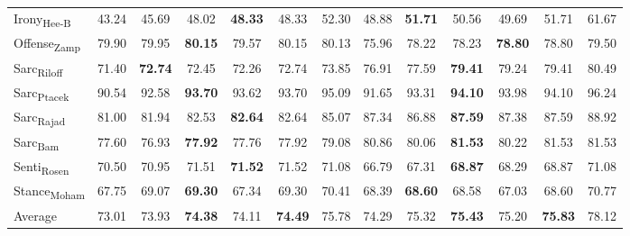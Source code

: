 \begin{table*}[]
\begin{tabular}{@{}lcccc:cc|cccc:cc@{}}
Irony\textsubscript{Hee-B}        & 43.24       & 45.69       & 48.02       & \textbf{48.33}       & 48.33         & 52.30         & 48.88       & \textbf{51.71}       & 50.56       & 49.69       & 51.71         & 61.67         \\
Offense\textsubscript{Zamp}       & 79.90       & 79.95       & \textbf{80.15}       & 79.57       & 80.15         & 80.13         & 75.96       & 78.22       & 78.23       & \textbf{78.80}       & 78.80         & 79.50         \\
Sarc\textsubscript{Riloff}        & 71.40       & \textbf{72.74}       & 72.45       & 72.26       & 72.74         & 73.85         & 76.91       & 77.59       & \textbf{79.41}       & 79.24       & 79.41         & 80.49         \\
Sarc\textsubscript{Ptacek}        & 90.54       & 92.58       & \textbf{93.70}       & 93.62       & 93.70        & 95.09         & 91.65       & 93.31       & \textbf{94.10}       & 93.98       & 94.10         & 96.24         \\
Sarc\textsubscript{Rajad}         & 81.00       & 81.94       & 82.53       & \textbf{82.64}       & 82.64         & 85.07         & 87.34       & 86.88       & \textbf{87.59}       & 87.38       & 87.59         & 88.92         \\
Sarc\textsubscript{Bam}           & 77.60       & 76.93       & \textbf{77.92}       & 77.76       & 77.92         & 79.08         & 80.86       & 80.06       & \textbf{81.53}       & 80.22       & 81.53         & 81.53         \\
Senti\textsubscript{Rosen}        & 70.50       & 70.95       & 71.51       & \textbf{71.52}       & 71.52         & 71.08         & 66.79       & 67.31       & \textbf{68.87}       & 68.29       & 68.87         & 71.08         \\
Stance\textsubscript{Moham}       & 67.75       & 69.07       & \textbf{69.30}       & 67.34       & 69.30         & 70.41         & 68.39       & \textbf{68.60}       & 68.58       & 67.03       & 68.60         & 70.77         \\  
Average                                            & 73.01       & 73.93       & \textbf{74.38}       & 74.11       & \textbf{74.49}         & 75.78         & 74.29       & 75.32       & \textbf{75.43}       & 75.20       & \textbf{75.83}         & 78.12         \\ \bottomrule
\end{tabular} %

\end{table*}
